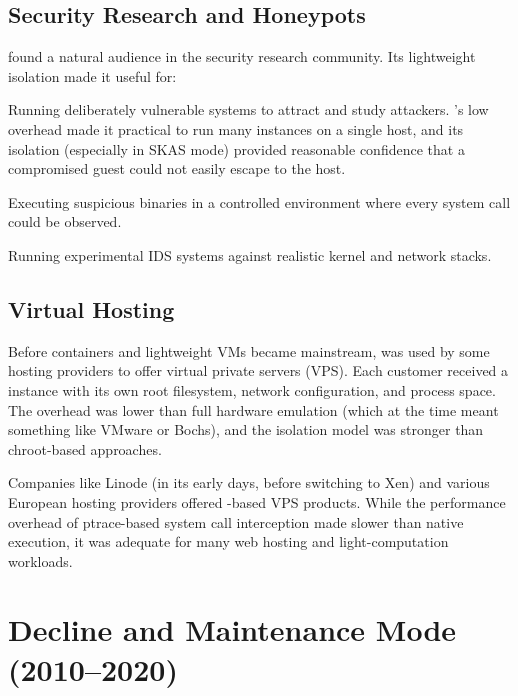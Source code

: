 \subsection{Security Research and Honeypots}
\label{sec:history-honeypots}

\UML{} found a natural audience in the security research community.  Its
lightweight isolation made it useful for:

\begin{description}[leftmargin=2em,labelindent=1em]
  \item[Honeypots] Running deliberately vulnerable systems to attract and study
    attackers.  \UML{}'s low overhead made it practical to run many instances
    on a single host, and its isolation (especially in SKAS mode) provided
    reasonable confidence that a compromised guest could not easily escape to
    the host.

  \item[Malware analysis] Executing suspicious binaries in a controlled
    environment where every system call could be observed.

  \item[Intrusion detection research] Running experimental IDS systems against
    realistic kernel and network stacks.
\end{description}

\subsection{Virtual Hosting}
\label{sec:history-vhosting}

Before containers and lightweight VMs became mainstream, \UML{} was used by
some hosting providers to offer virtual private servers (VPS).  Each customer
received a \UML{} instance with its own root filesystem, network configuration,
and process space.  The overhead was lower than full hardware emulation (which
at the time meant something like VMware or Bochs), and the isolation model was
stronger than chroot-based approaches.

Companies like Linode (in its early days, before switching to Xen) and various
European hosting providers offered \UML{}-based VPS products.  While the
performance overhead of ptrace-based system call interception made \UML{} slower
than native execution, it was adequate for many web hosting and
light-computation workloads.

\section{Decline and Maintenance Mode (2010--2020)}
\label{sec:history-decline}

